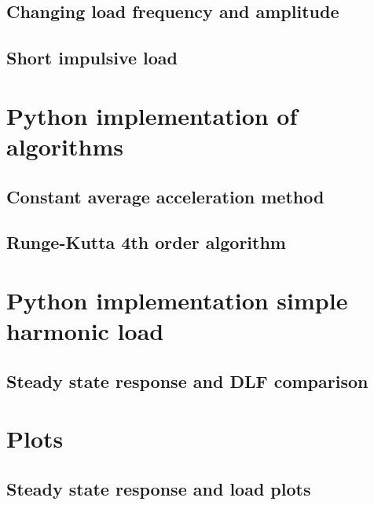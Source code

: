 \documentclass[11pt, a4paper, english, hidelinks]{NTNUoving}
\begin{document}
\subsection{Changing load frequency and amplitude}
\subsection{Short impulsive load}

\newpage
\appendix
\appendixpage
\addappheadtotoc
\section{Python implementation of algorithms}
\subsection{Constant average acceleration method}
\label{app:pythoncaa}

\subsection{Runge-Kutta 4th order algorithm}
\label{app:pythonrk4}
\section{Python implementation simple harmonic load}
\subsection{Steady state response and DLF comparison}
\label{app:pythondlf}

\section{Plots}
\subsection{Steady state response and load plots}
\label{app:SSload}
\end{document}

